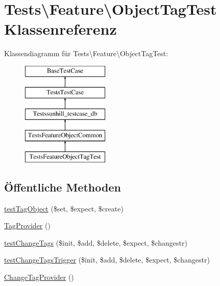 \hypertarget{classTests_1_1Feature_1_1ObjectTagTest}{}\section{Tests\textbackslash{}Feature\textbackslash{}Object\+Tag\+Test Klassenreferenz}
\label{classTests_1_1Feature_1_1ObjectTagTest}
Klassendiagramm für Tests\textbackslash{}Feature\textbackslash{}Object\+Tag\+Test\+:\begin{figure}[H]
\begin{center}
\leavevmode
\includegraphics[height=5.000000cm]{d1/d92/classTests_1_1Feature_1_1ObjectTagTest}
\end{center}
\end{figure}
\subsection*{Öffentliche Methoden}
\begin{DoxyCompactItemize}
\item 
\hyperlink{classTests_1_1Feature_1_1ObjectTagTest_ab58efd7b7f70a989839b59ba36a7e684}{test\+Tag\+Object} (\$set, \$expect, \$create)
\item 
\hyperlink{classTests_1_1Feature_1_1ObjectTagTest_a69380c8d313bb68066c62206778bba6f}{Tag\+Provider} ()
\item 
\hyperlink{classTests_1_1Feature_1_1ObjectTagTest_ac0ee197de5ea31fe1215d9619623a254}{test\+Change\+Tags} (\$init, \$add, \$delete, \$expect, \$changestr)
\item 
\hyperlink{classTests_1_1Feature_1_1ObjectTagTest_a2641d8e25de82476bd67db4643d1b784}{test\+Change\+Tags\+Trigger} (\$init, \$add, \$delete, \$expect, \$changestr)
\item 
\hyperlink{classTests_1_1Feature_1_1ObjectTagTest_a604c6b06fead3ef59d8a7a9192c86069}{Change\+Tag\+Provider} ()
\end{DoxyCompactItemize}
